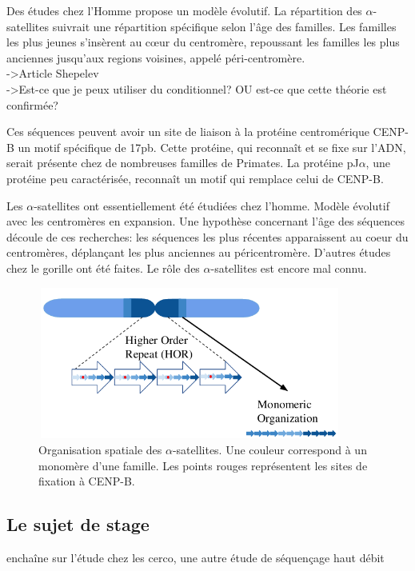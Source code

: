 \documentclass[12pt,a4paper]{article}
\begin{document}
Des études chez l'Homme propose un modèle évolutif. La répartition des $\alpha$-satellites suivrait une répartition spécifique selon l'âge des familles. Les familles les plus jeunes s'insèrent au cœur du centromère, repoussant les familles les plus anciennes jusqu'aux regions voisines, appelé péri-centromère.\\
->Article Shepelev\\
->Est-ce que je peux utiliser du conditionnel? OU est-ce que cette théorie est confirmée?

Ces séquences peuvent avoir un site de liaison à la protéine centromérique CENP-B un motif spécifique de 17pb. Cette protéine, qui reconnaît et se fixe sur l'ADN, serait présente chez de nombreuses familles de Primates. La protéine pJ$\alpha$, une protéine peu caractérisée, reconnaît un motif qui remplace celui de CENP-B.

Les $\alpha$-satellites ont essentiellement été étudiées chez l'homme. Modèle évolutif avec les centromères en expansion. Une hypothèse concernant l'âge des séquences découle de ces recherches: les séquences les plus récentes apparaissent au coeur du centromères, déplançant les plus anciennes au péricentromère. D'autres études chez le gorille ont été faites. Le rôle des $\alpha$-satellites est encore mal connu. 

\begin{figure}
\center
\includegraphics[height=5cm, width=10cm]{img/organization.png}
\caption{Organisation spatiale des $\alpha$-satellites. Une couleur correspond à un monomère d'une famille. Les points rouges représentent les sites de fixation à CENP-B.}
\end{figure}


\subsection{Le sujet de stage}
enchaîne sur l'étude chez les cerco, une autre étude de séquençage haut débit\\
\end{document}
